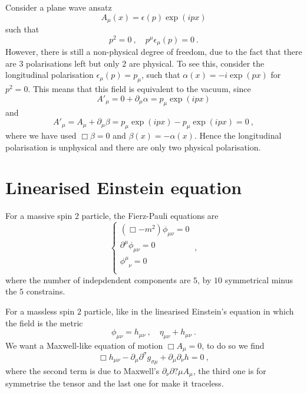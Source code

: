     Consider a plane wave ansatz 
    \begin{equation*}
        A_\mu (x) = \epsilon (p) \exp(i p x)
    \end{equation*}
    such that
    \begin{equation*}
        p^2 = 0 ~, \quad p^\mu \epsilon_\mu (p) = 0 ~.
    \end{equation*}
    However, there is still a non-physical degree of freedom, due to the fact that there are $3$ polarisations left but only $2$ are physical. To see this, consider the longitudinal polarisation $\epsilon_\mu (p) = p_\mu$, such that $\alpha(x) = - i \exp(p x)$ for $p^2 = 0$. This means that this field is equivalent to the vacuum, since
    \begin{equation*}
        {A'}_\mu = 0 + \partial_\mu \alpha = p_\mu \exp(ipx) 
    \end{equation*}
    and 
    \begin{equation*}
        {A'}_\mu = A_\mu + \partial_\mu \beta = p_\mu \exp(i p x) - p_\mu \exp(i p x) = 0~,
    \end{equation*}
    where we have used $\Box \beta = 0$ and $\beta (x) = - \alpha (x)$. Hence the longitudinal polarisation is unphysical and there are only two physical polarisation.

\section{Linearised Einstein equation}  

    For a massive spin $2$ particle, the Fierz-Pauli equations are 
    \begin{equation*}
        \begin{cases}
            (\Box - m^2) \phi_{\mu\nu} = 0 \\
            \partial^\mu \phi_{\mu\nu} = 0 \\
            \phi^\mu_{\phantom \mu \nu} = 0 \\
        \end{cases} ~,
    \end{equation*}
    where the number of indepdendent components are $5$, by $10$ symmetrical minus the $5$ constrains. 

    For a massless spin $2$ particle, like in the linearised Einstein's equation in which the field is the metric 
    \begin{equation*}
        \phi_{\mu\nu} = h_{\mu\nu}~, \quad \eta_{\mu\nu} + h_{\mu\nu} ~.
    \end{equation*}
    We want a Maxwell-like equation of motion $\Box A_\mu = 0$, to do so we find 
    \begin{equation*}
        \Box h_{\mu\nu} - \partial_\mu \partial^\sigma g_{\sigma \mu} + \partial_\mu \partial_\nu h = 0 ~,
    \end{equation*}
    where the second term is due to Maxwell's $\partial_\nu \partial?\mu A_\mu$, the third one is for symmetrise the tensor and the last one for make it traceless. 


